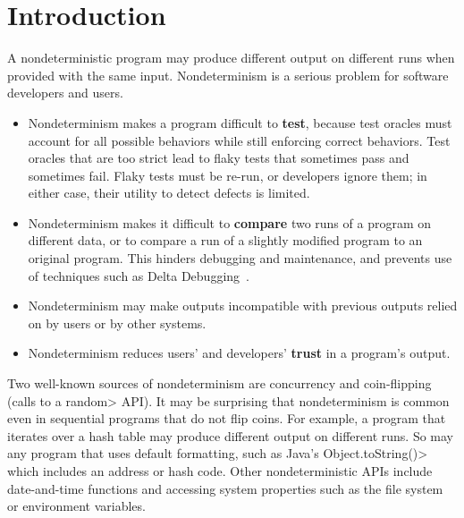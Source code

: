 \section{Introduction}

A nondeterministic program may produce different output on different runs
when provided with the same input.
Nondeterminism is a serious problem for software developers and users.
\begin{itemize}
\item
  Nondeterminism makes a program difficult to \textbf{test}, because test
  oracles must account for all possible behaviors while still enforcing
  correct behaviors.  Test oracles that are too strict lead to flaky tests
  that sometimes pass and sometimes fail.  Flaky tests must be re-run, or
  developers ignore them; in either case, their utility to detect defects
  is limited.
\item
  Nondeterminism makes it difficult to \textbf{compare} two runs of a
  program on different data, or to compare a run of a slightly modified
  program to an original program.  This hinders debugging and maintenance,
  and prevents use of techniques such as Delta Debugging~\cite{Zeller1999}.
\item
  Nondeterminism may make outputs incompatible with previous outputs relied
  on by users or by other systems.
\item
  Nondeterminism reduces users' and developers' \textbf{trust} in a program's output.
\end{itemize}

Two well-known sources of nondeterminism are concurrency
and coin-flipping
(calls to a \<random> API\@).
It may be surprising that nondeterminism is common even in sequential
programs that do not flip coins.
For example, a program that iterates over a hash table
may produce different output on different runs.
So may any program that uses default formatting, such as Java's
\<Object.toString()> which includes an address or hash code.
Other nondeterministic APIs include date-and-time functions and
accessing system properties such as the file system or environment variables.

